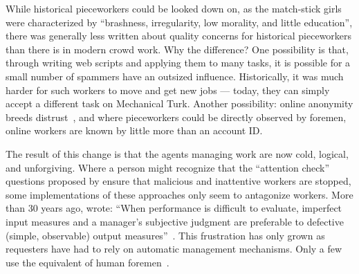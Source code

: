 \documentclass[trackingWork]{subfiles}
\begin{document}
While historical pieceworkers could be looked down on, as the match-stick girls were characterized by ``brashness, irregularity, low morality, and little education'', there was generally less written about quality concerns for historical pieceworkers than there is in modern crowd work. 
Why the difference? 
One possibility is that, through writing web scripts and applying them to many tasks, it is possible for a small number of spammers have an outsized influence.
Historically, it was much harder for such workers to move and get new jobs --- today, they can simply accept a different task on Mechanical Turk.
Another possibility: online anonymity breeds distrust~\cite{friedman2000trust}, and where pieceworkers could be directly observed by foremen, online workers are known by little more than an account ID.




The result of this change is that the agents managing work are now
cold, logical, and unforgiving.
Where a person might recognize that the ``attention check'' questions 
proposed by \citeauthor{le2010ensuring} ensure that malicious and inattentive workers are stopped,
some implementations of these approaches
only seem to antagonize workers.
More than 30 years ago, \citeauthor{10.2307/2555446} wrote:
``When performance is difficult to evaluate,
imperfect input measures and
a manager's subjective judgment are preferable to
defective (simple, observable) output measures''~\cite{10.2307/2555446}.
This frustration has only grown as requesters have had to rely on automatic management mechanisms. Only a few use the equivalent of human foremen~\cite{haas2015argonaut,kulkarni2012mobileworks}.
\end{document}
